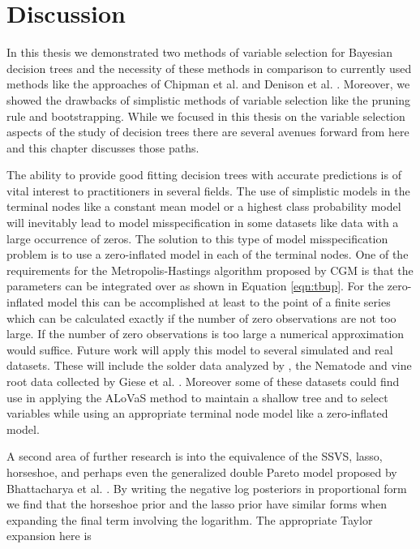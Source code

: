 \section{Discussion}
\label{ch:discuss}
 
In this thesis we demonstrated two methods of variable selection for Bayesian decision trees and the necessity of these methods in comparison to currently used methods like the approaches of Chipman et al. \cite{chipman1998bayesian} and Denison et al. \cite{denison1998bayesian}. Moreover, we showed the drawbacks of simplistic methods of variable selection like the pruning rule and bootstrapping. While we focused in this thesis on the variable selection aspects of the study of decision trees there are several avenues forward from here and this chapter discusses those paths. 

The ability to provide good fitting decision trees with accurate predictions is of vital interest to practitioners in several fields. The use of simplistic models in the terminal nodes like a constant mean model or a highest class probability model will inevitably lead to model misspecification in some datasets like data with a large occurrence of zeros. The solution to this type of model misspecification problem is to use a zero-inflated model in each of the terminal nodes. One of the requirements for the Metropolis-Hastings algorithm proposed by CGM is that the parameters can be integrated over as shown in Equation \ref{eqn:tbup}. For the zero-inflated model this can be accomplished at least to the point of a finite series which can be calculated exactly if the number of zero observations are not too large. If the number of zero observations is too large a numerical approximation would suffice. Future work will apply this model to several simulated and real datasets. These will include the solder data analyzed by \cite{lee2006decision}, the Nematode and vine root data collected by Giese et al. \cite{}. Moreover some of these datasets could find use in applying the ALoVaS method to maintain a shallow tree and to select variables while using an appropriate terminal node model like a zero-inflated model.  

A second area of further research is into the equivalence of the SSVS, lasso, horseshoe, and perhaps even the generalized double Pareto model proposed by Bhattacharya et al. \cite{bhattacharya2012bayesian}. By writing the negative log posteriors in proportional form we find that the horseshoe prior and the lasso prior have similar forms when expanding the final term involving the logarithm. The appropriate Taylor expansion here is 

